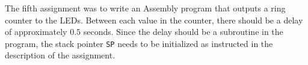 The fifth assignment was to write an Assembly program that outputs a ring counter to the LEDs. Between each value in the counter, there should be a delay of approximately $0.5$ seconds. Since the delay should be a subroutine in the program, the stack pointer \texttt{SP} needs to be initialized as instructed in the description of the assignment.
